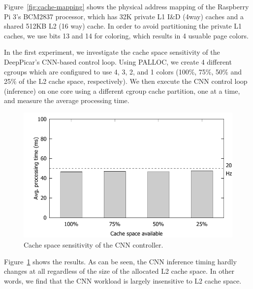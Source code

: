 Figure~\ref{fig:cache-mapping} shows the physical address
mapping of the Raspberry Pi 3's BCM2837 processor, which has 32K private
L1 I\&D (4way) caches and a shared 512KB L2 (16 way) cache. In order
to avoid partitioning the private L1 caches, we use bits 13 and 14 for
coloring, which results in 4 usuable page colors.



In the first experiment, we investigate the cache space sensitivity of
the DeepPicar's CNN-based control loop. Using PALLOC, we create 4
different cgroups which are configured to use 4, 3,
2, and 1 colors (100\%, 75\%, 50\% and 25\% of the L2 cache
space, respectively). We then execute the CNN control loop (inference)
on one core using a different cgroup cache partition, one at a time,
and measure the average processing time.

\begin{figure}[h]
  \centering
  \includegraphics[width=.45\textwidth]{figs/palloc_multicore}
  \caption{Cache space sensitivity of the CNN controller.}
  \label{fig:palloc_multicore}
\end{figure}

Figure~\ref{fig:palloc_multicore} shows the results. As can be seen,
the CNN inference timing hardly changes at all regardless of the
size of the allocated L2 cache space. In other words, we find that
the CNN workload is largely insensitive to L2 cache space.

